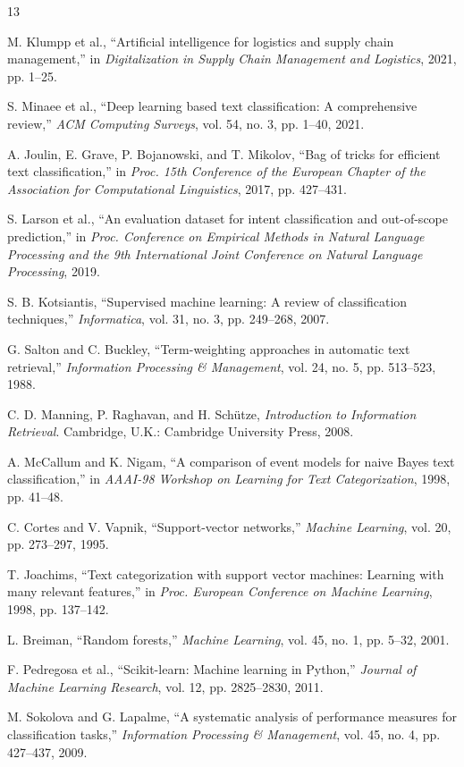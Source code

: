 \documentclass[conference]{IEEEtran}
\begin{document}
\begin{thebibliography}{13}

M. Klumpp et al., ``Artificial intelligence for logistics and supply chain management,'' in \emph{Digitalization in Supply Chain Management and Logistics}, 2021, pp. 1--25.

S. Minaee et al., ``Deep learning based text classification: A comprehensive review,'' \emph{ACM Computing Surveys}, vol. 54, no. 3, pp. 1--40, 2021.

A. Joulin, E. Grave, P. Bojanowski, and T. Mikolov, ``Bag of tricks for efficient text classification,'' in \emph{Proc. 15th Conference of the European Chapter of the Association for Computational Linguistics}, 2017, pp. 427--431.

S. Larson et al., ``An evaluation dataset for intent classification and out-of-scope prediction,'' in \emph{Proc. Conference on Empirical Methods in Natural Language Processing and the 9th International Joint Conference on Natural Language Processing}, 2019.

S. B. Kotsiantis, ``Supervised machine learning: A review of classification techniques,'' \emph{Informatica}, vol. 31, no. 3, pp. 249--268, 2007.

G. Salton and C. Buckley, ``Term-weighting approaches in automatic text retrieval,'' \emph{Information Processing \& Management}, vol. 24, no. 5, pp. 513--523, 1988.

C. D. Manning, P. Raghavan, and H. Schütze, \emph{Introduction to Information Retrieval}. Cambridge, U.K.: Cambridge University Press, 2008.

A. McCallum and K. Nigam, ``A comparison of event models for naive Bayes text classification,'' in \emph{AAAI-98 Workshop on Learning for Text Categorization}, 1998, pp. 41--48.

C. Cortes and V. Vapnik, ``Support-vector networks,'' \emph{Machine Learning}, vol. 20, pp. 273--297, 1995.

T. Joachims, ``Text categorization with support vector machines: Learning with many relevant features,'' in \emph{Proc. European Conference on Machine Learning}, 1998, pp. 137--142.

L. Breiman, ``Random forests,'' \emph{Machine Learning}, vol. 45, no. 1, pp. 5--32, 2001.

F. Pedregosa et al., ``Scikit-learn: Machine learning in Python,'' \emph{Journal of Machine Learning Research}, vol. 12, pp. 2825--2830, 2011.

M. Sokolova and G. Lapalme, ``A systematic analysis of performance measures for classification tasks,'' \emph{Information Processing \& Management}, vol. 45, no. 4, pp. 427--437, 2009.

\end{thebibliography}
\end{document}
